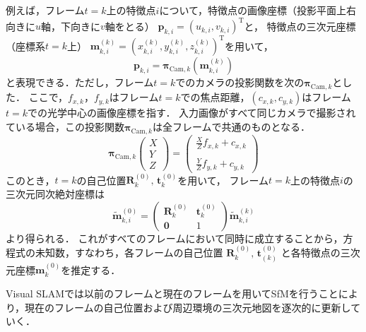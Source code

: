 例えば，フレーム$t=k$上の特徴点$i$について，特徴点の画像座標（投影平面上右向きに$u$軸，下向きに$v$軸をとる）
$\mathbf{p}_{k,i}={(u_{k,i} , v_{k,i})}^\mathrm{T}$と，
特徴点の三次元座標（座標系$t=k$上）
$\mathbf{m}^{(k)}_{k,i}={(x^{(k)}_{k,i} , y^{(k)}_{k,i} , z^{(k)}_{k,i})}^\mathrm{T}$を用いて，
\begin{equation}\label{eq:point2pro}
	\mathbf{p}_{k,i}
	=
	\boldsymbol{\pi}_{\text{Cam},k}
	\left(\mathbf{m}^{(k)}_{k,i}
	\right)
\end{equation}
と表現できる．ただし，フレーム$t=k$でのカメラの投影関数を次の$\boldsymbol{\pi}_{\text{Cam},k}$とした．
ここで，$f_{x,k}$，$f_{y,k}$はフレーム$t=k$での焦点距離，$(c_{x,k},c_{y,k})$はフレーム$t=k$での光学中心の画像座標を指す．
入力画像がすべて同じカメラで撮影されている場合，この投影関数$\boldsymbol{\pi}_{\text{Cam},k}$は全フレームで共通のものとなる．
\begin{equation}\label{eq:projection}
	\boldsymbol{\pi}_{\text{Cam},k}
	\left(
	\begin{array}{c}
	X\\Y\\Z
	\end{array}
	\right)
	=
	\left(
	\begin{array}{c}
		\frac{X}{Z}f_{x,k}+c_{x,k}  \\ \\  \frac{Y}{Z}f_{y,k}+c_{y,k} 
	\end{array}
	\right)
\end{equation}
このとき，$t=k$の自己位置$\mathbf{R}^{(0)}_{k}, \, \mathbf{t}^{(0)}_{k} $を用いて，
フレーム$t=k$上の特徴点$i$の三次元同次絶対座標は
\begin{equation}\label{eq:henkan}
    \tilde{\mathbf{m}}^{(0)}_{k,i}=
    \left(\begin{array}{cc}
\mathbf{R}^{(0)}_{k}  &  \mathbf{t}^{(0)}_{k}  \\
 \mathbf{0} & 1 
\end{array}\right)
    \tilde{\mathbf{m}}^{(k)}_{k,i}
\end{equation}
より得られる．
これがすべてのフレームにおいて同時に成立することから，方程式の未知数，すなわち，各フレームの自己位置
$ \mathbf{R}^{(0)}_{k}, \, \mathbf{t}^{(0)}_{(k)}$
と各特徴点の三次元座標$\mathbf{m}^{(0)}_{k}$を推定する．

Visual SLAMでは以前のフレームと現在のフレームを用いてSfMを行うことにより，現在のフレームの自己位置および周辺環境の三次元地図を逐次的に更新していく．

